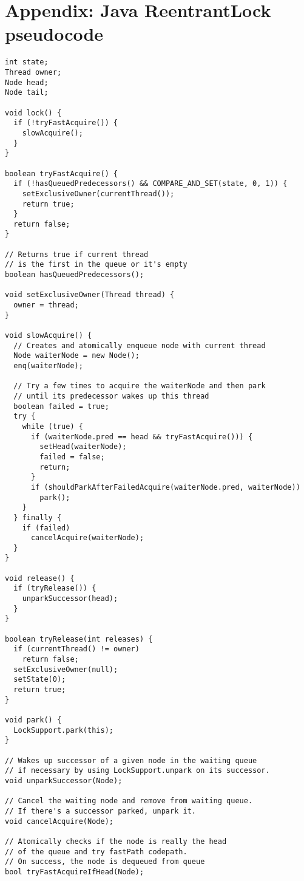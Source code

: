 \section*{Appendix: Java ReentrantLock pseudocode}

\noindent
\begin{verbatim}
int state;
Thread owner;
Node head;
Node tail;

void lock() {
  if (!tryFastAcquire()) {
    slowAcquire();
  }
}

boolean tryFastAcquire() {
  if (!hasQueuedPredecessors() && COMPARE_AND_SET(state, 0, 1)) {
    setExclusiveOwner(currentThread());
    return true;
  }
  return false;	
}

// Returns true if current thread
// is the first in the queue or it's empty
boolean hasQueuedPredecessors();

void setExclusiveOwner(Thread thread) {
  owner = thread;
}

void slowAcquire() {
  // Creates and atomically enqueue node with current thread
  Node waiterNode = new Node();
  enq(waiterNode);

  // Try a few times to acquire the waiterNode and then park
  // until its predecessor wakes up this thread
  boolean failed = true;
  try {
    while (true) {
      if (waiterNode.pred == head && tryFastAcquire())) {
        setHead(waiterNode);
        failed = false;
        return;
      }
      if (shouldParkAfterFailedAcquire(waiterNode.pred, waiterNode))
        park();
    }
  } finally {
    if (failed)
      cancelAcquire(waiterNode);
  }
}

void release() {
  if (tryRelease()) {
    unparkSuccessor(head);
  }
}

boolean tryRelease(int releases) {
  if (currentThread() != owner)
    return false;
  setExclusiveOwner(null);
  setState(0);
  return true;
}

void park() {
  LockSupport.park(this);
}

// Wakes up successor of a given node in the waiting queue
// if necessary by using LockSupport.unpark on its successor.
void unparkSuccessor(Node);

// Cancel the waiting node and remove from waiting queue.
// If there's a successor parked, unpark it.
void cancelAcquire(Node);

// Atomically checks if the node is really the head
// of the queue and try fastPath codepath.
// On success, the node is dequeued from queue
bool tryFastAcquireIfHead(Node);


\end{verbatim}
